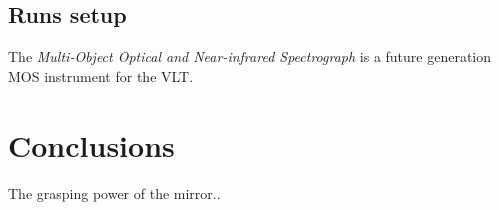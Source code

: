 \documentclass[binding=0.6cm,LaM]{sapthesis}
\begin{document}
\section{Runs setup}
\label{sec:moons}
The \textit{Multi-Object Optical and Near-infrared Spectrograph} is a future generation MOS instrument for the VLT. 


\chapter{Conclusions}
\label{chap:5} 
The grasping power of the mirror..





\backmatter
\cleardoublepage %

\printbibheading
\printbibliography[type=article,heading=subbibliography,title={Articles}]
\printbibliography[type=inproceedings,heading=subbibliography,title={Inproceedings}]
\printbibliography[type=misc,heading=subbibliography,title={Miscellaneous}]
\end{document}
